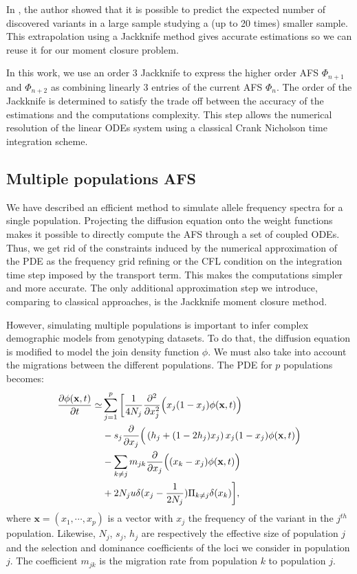In \cite{gravel2014}, the author showed that it is possible to predict the expected number of discovered variants in a large sample studying a (up to 20 times) smaller sample. This extrapolation using a Jackknife method gives accurate estimations so we can reuse it for our moment closure problem.

In this work, we use an order 3 Jackknife to express the higher order AFS $\Phi_{n+1}$ and $\Phi_{n+2}$ as combining linearly 3 entries of the current AFS $\Phi_n$. The order of the Jackknife is determined to satisfy the trade off between the accuracy of the estimations and the computations complexity. This step allows the numerical resolution of the linear ODEs system using a classical Crank Nicholson time integration scheme.  

\subsection{Multiple populations AFS}
We have described an efficient method to simulate allele frequency spectra for a single population. Projecting the diffusion equation onto the weight functions makes it possible to directly compute the AFS through a set of coupled ODEs. Thus, we get rid of the constraints induced by the numerical approximation of the PDE as the frequency grid refining or the CFL condition on the integration time step imposed by the transport term. This makes the computations simpler and more accurate. The only additional approximation step we introduce, comparing to classical approaches, is the Jackknife moment closure method.

However, simulating multiple populations is important to infer complex demographic models from genotyping datasets. To do that, the diffusion equation is modified to model the join density function $\phi$. We must also take into account the migrations between the different populations. The PDE for $p$ populations becomes: 
\begin{equation}
\begin{split}
\frac{\partial \phi(\textbf{x},t)}{\partial t}\simeq & \sum_{j=1}^p \bigg[ \frac{1}{4 N_j} \frac{\partial^2 }{\partial x_j^2} \Big( x_j(1-x_j) \phi(\textbf{x},t)\Big) \\
					&-s_j \frac{\partial }{\partial x_j}\Big( \left(h_j+(1-2h_j)x_j \right)x_j (1-x_j) \phi(\textbf{x},t)\Big) \\
					&-\sum_{k \neq j}m_{jk}\frac{\partial }{\partial x_j}\Big( (x_k-x_j) \phi(\textbf{x},t)\Big)\\
					&+ 2 N_j u \delta(x_j-\frac{1}{2 N_j})\Pi_{k\neq j}\delta(x_k)\bigg],
\end{split}
\label{eq:diffnp}
\end{equation}
where $\textbf{x} = (x_1, \cdots, x_p)$ is a vector with $x_j$ the frequency of the variant in the $j^{th}$ population. Likewise, $N_j$, $s_j$, $h_j$ are respectively the effective size of population $j$ and the selection and dominance coefficients of the loci we consider in population $j$. The coefficient $m_{jk}$ is the migration rate from population $k$ to population $j$.

